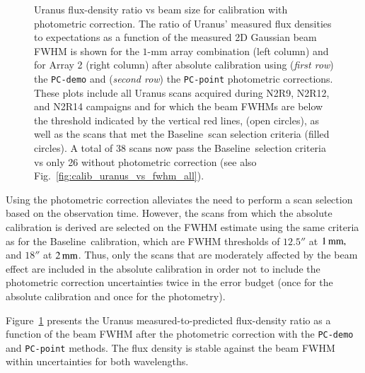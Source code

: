 \documentclass[traditionalabstract]{aa}
\newcommand{\baseline}{Baseline}%
\begin{document}
{\begin{appendix}
\begin{figure}[!htbp]
\begin{center}
    \vspace{-0.5cm}
    \caption[Uranus flux density stability against FWHM]{
      \small{Uranus flux-density ratio vs beam size for calibration
  with photometric correction. The ratio of 
      Uranus' measured flux densities to expectations as a function of the
      measured 2D Gaussian beam FWHM is shown for the $1$-mm array
      combination (left column) and for Array 2 (right column) after absolute
      calibration using (\emph{first row}) the {\tt PC-demo} and (\emph{second
        row}) the {\tt PC-point} photometric corrections. These plots
      include all Uranus scans acquired during N2R9, N2R12, and N2R14
      campaigns and for which the beam FWHMs are below the threshold indicated
      by the vertical red lines, (open circles), as
      well as the scans that met the \baseline\ scan selection criteria (filled
      circles). A total of 38 scans now pass the \baseline\ selection criteria vs only 26
      without photometric correction (see also Fig.~\ref{fig:calib_uranus_vs_fwhm_all}).}}
\label{fig:calib_uranus_vs_fwhm_photocorr}
\end{center}
\end{figure}

Using the photometric correction alleviates the need to
perform a scan selection based on the observation time. However,
the scans from which the absolute calibration is derived are selected
on the FWHM estimate using the same criteria as for the \baseline\
calibration, which are FWHM thresholds of $12.5''$ at $1\, \rm{mm,}$ and $18''$ at
$2\, \rm{mm}$. Thus, only the scans that are moderately affected by the beam
effect are included in the absolute calibration in order not to
include the photometric correction uncertainties twice in the error
budget (once for the absolute calibration and once for the photometry).

Figure~\ref{fig:calib_uranus_vs_fwhm_photocorr} presents the Uranus
measured-to-predicted flux-density ratio as a function of the beam FWHM
after the photometric correction with the {\tt PC-demo} and
{\tt PC-point} methods. The flux
density is stable against the beam FWHM within uncertainties for both
wavelengths.


\end{appendix}}
\end{document}
